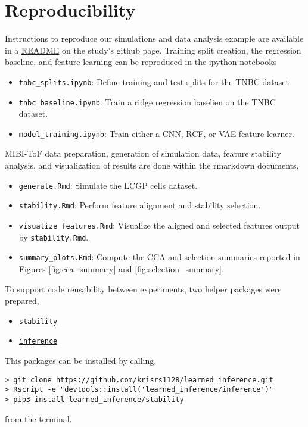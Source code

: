 
\section{Reproducibility}

Instructions to reproduce our simulations and data analysis example are
available in a \href{https://github.com/krisrs1128/learned_inference}{README} on
the study's github page. Training split creation, the regression baseline, and
feature learning can be reproduced in the ipython notebooks

\begin{itemize}
\item \texttt{tnbc\_splits.ipynb}: Define training and test splits for the TNBC
  dataset.
\item \texttt{tnbc\_baseline.ipynb}: Train a ridge regression baselien on the
  TNBC dataset.
\item \texttt{model\_training.ipynb}: Train either a CNN, RCF, or VAE feature
  learner.
\end{itemize}

MIBI-ToF data preparation, generation of simulation data, feature stability
analysis, and visualization of results are done within the rmarkdown documents,

\begin{itemize}
\item \texttt{generate.Rmd}: Simulate the LCGP cells dataset.
\item \texttt{stability.Rmd}: Perform feature alignment and stability selection.
\item \texttt{visualize\_features.Rmd}: Visualize the aligned and selected
  features output by \texttt{stability.Rmd}.
\item \texttt{summary\_plots.Rmd}: Compute the CCA and selection summaries
  reported in Figures \ref{fig:cca_summary} and \ref{fig:selection_summary}.
\end{itemize}

To support code reusability between experiments, two helper packages were
prepared,
\begin{itemize}
\item \href{https://github.com/krisrs1128/learned_inference/tree/master/stability}{\texttt{stability}}
\item \href{https://github.com/krisrs1128/learned_inference/tree/master/inference}{\texttt{inference}}
\end{itemize}

This packages can be installed by calling,
\begin{verbatim}
> git clone https://github.com/krisrs1128/learned_inference.git
> Rscript -e "devtools::install('learned_inference/inference')"
> pip3 install learned_inference/stability
\end{verbatim}
from the terminal.

